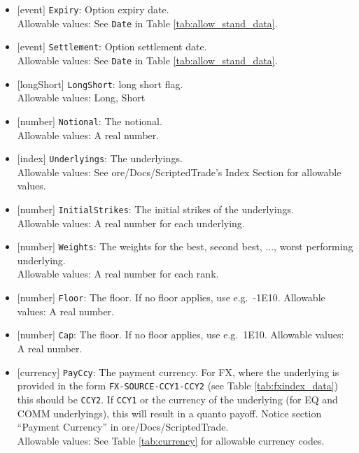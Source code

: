 \begin{itemize}
    \item{}[event] \lstinline!Expiry!: Option expiry date. \\
      Allowable values: See \lstinline!Date! in Table \ref{tab:allow_stand_data}.
    \item{}[event] \lstinline!Settlement!: Option settlement date. \\
      Allowable values: See \lstinline!Date! in Table \ref{tab:allow_stand_data}.
    \item{}[longShort] \lstinline!LongShort!: long short flag. \\
      Allowable values: Long, Short
    \item{}[number] \lstinline!Notional!: The notional. \\
      Allowable values: A real number.
    \item{}[index] \lstinline!Underlyings!: The underlyings. \\
      Allowable values: See ore/Docs/ScriptedTrade's Index Section for allowable values.
      \item{}[number] \lstinline!InitialStrikes!: The initial strikes of the underlyings.\\
        Allowable values: A real number for each underlying.
      \item{}[number] \lstinline!Weights!: The weights for the best, second best, ..., worst performing underlying.\\
        Allowable values: A real number for each rank.
      \item{}[number] \lstinline!Floor!: The floor. If no floor applies, use e.g.\ -1E10.
        Allowable values: A real number.
      \item{}[number] \lstinline!Cap!: The floor. If no floor applies, use e.g.\ 1E10.
        Allowable values: A real number.
      \item{}[currency] \lstinline!PayCcy!: The payment currency. For FX, where the underlying is provided
      in the form \lstinline!FX-SOURCE-CCY1-CCY2! (see Table \ref{tab:fxindex_data}) this should
      be \lstinline!CCY2!. If \lstinline!CCY1! or the currency of the underlying (for EQ and
      COMM underlyings), this will result in a quanto payoff. Notice section ``Payment Currency'' in ore/Docs/ScriptedTrade. \\
        Allowable values: See Table \ref{tab:currency} for allowable currency codes.
 \end{itemize}

